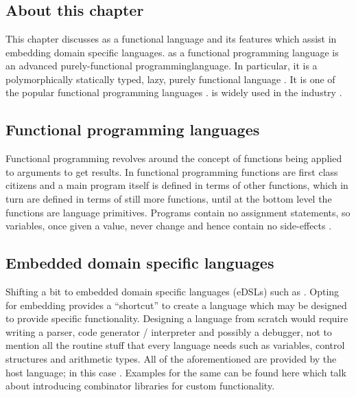 \documentclass[thesis-solanki.tex]{subfiles}
\begin{document}
\chapter{}\label{chap:hwh}


\section{About this chapter}
This chapter discusses  as a functional language and its features which assist in embedding domain specific languages.
 as a functional programming language  is an advanced purely-functional
programminglanguage.
In particular, it is a polymorphically statically typed, lazy, purely functional language
\cite{website:haskellwiki}.
It is one of the popular functional programming languages \cite{website:langpop}.
 is widely used in the industry \cite{website:haskellinindustry}.
  
\section{Functional programming languages}
Functional programming revolves around the concept of functions being applied to arguments to get results.
In functional programming functions are first class citizens and a main program itself is defined in terms of other
functions, which in turn are defined in terms of still more functions, until at the bottom level the functions are
language primitives.
Programs contain no assignment statements, so variables, once given a value, never change and hence contain no
side-effects \cite{hughes1989functional}.


\section{Embedded domain specific languages}
  Shifting a bit to embedded domain specific languages (eDSLs) such as .
  Opting for embedding provides a ``shortcut'' to create a language which may be designed to provide specific
  functionality.
  Designing a language from scratch would require writing a parser, code generator / interpreter and possibly a
  debugger, not to mention all the routine stuff that every language
  needs such as variables, control structures and 
  arithmetic types.
  All of the aforementioned are provided by the host language; in this case .
  Examples for the same can be found here \cite{jones2001composing, meyer2008eiffel} which talk about introducing
  combinator libraries for custom functionality.
\end{document}
